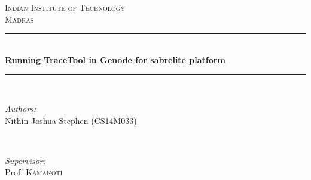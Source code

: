 \documentclass[12pt]{article}
\begin{document}
\begin{titlepage}

\newcommand{\HRule}{\rule{\linewidth}{0.5mm}} %

\center %
 

\textsc{\LARGE Indian Institute of Technology} \\[0.5cm]
\textsc{\LARGE Madras}\\[1cm] %


\HRule \\[0.4cm]
{ \LARGE \bfseries Running TraceTool in Genode for sabrelite platform}\\[0.4cm] %
\HRule \\[1.5cm]
 

\begin{minipage}{0.4\textwidth}
\begin{flushleft} \large
\emph{Authors:}\\
Nithin Joshua Stephen (CS14M033) %
\end{flushleft}
\end{minipage}
~
\begin{minipage}{0.5\textwidth}
\begin{flushright} \large
\emph{Supervisor:} \\
Prof.  \textsc{Kamakoti} %
\end{flushright}
\end{minipage}\\[2cm]


\end{titlepage}
\end{document}
